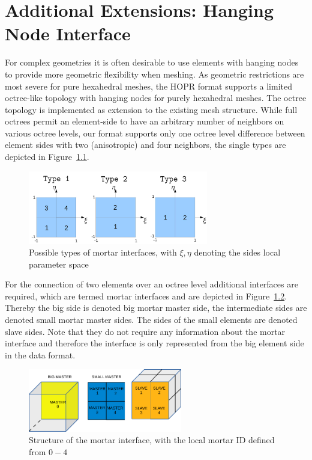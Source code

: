 \documentclass[a4paper,headsepline]{scrreprt}
\begin{document}
\chapter{Additional Extensions: Hanging Node Interface}

For complex geometries it is often desirable to use elements with hanging nodes to provide more geometric flexibility when meshing. As geometric restrictions are most severe for pure hexahedral meshes, the HOPR format supports a limited octree-like topology with hanging nodes for purely hexahedral meshes. The octree topology is implemented as extension to the existing mesh structure. 
While full octrees permit an element-side to have an arbitrary number of neighbors on various octree levels, our format supports only one octree level difference between element sides with two (anisotropic) and four neighbors, the single types are depicted in Figure~\ref{fig:mortartypes}.

\begin{figure}[h!]
\centering
\includegraphics[width=0.7\textwidth]{pics/Mortar_Types.jpg}
\caption{Possible types of mortar interfaces, with $\xi,\eta$ denoting the sides local parameter space}
\label{fig:mortartypes}
\end{figure}

For the connection of two elements over an octree level additional interfaces are required, which are termed mortar interfaces and are depicted in Figure~\ref{fig:mortarinterface}.
Thereby the big side is denoted big mortar master side, the intermediate sides are denoted small mortar master sides. The sides of the small elements are denoted slave sides. Note that they do not require any information about the mortar interface and therefore the interface is only represented from the big element side in the data format.


\begin{figure}[h!]
\centering
\includegraphics[trim=0 0 0 0,clip,width=0.6\textwidth]{pics/mortar_structure.pdf}
\caption{Structure of the mortar interface, with the local mortar ID defined from $0-4$}
\label{fig:mortarinterface}
\end{figure}
\end{document}
